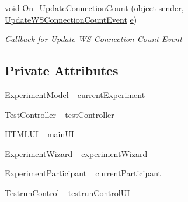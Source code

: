 \begin{DoxyCompactItemize}
\item 
void \hyperlink{class_web_analyzer_1_1_controller_1_1_main_controller_aa5f17af11b8604a5bb8d78d3f7ec5d7a}{On\+\_\+\+Update\+Connection\+Count} (\hyperlink{_u_i_2_h_t_m_l_resources_2js_2lib_2underscore_8min_8js_aae18b7515bb2bc4137586506e7c0c903}{object} sender, \hyperlink{class_web_analyzer_1_1_events_1_1_update_w_s_connection_count_event}{Update\+W\+S\+Connection\+Count\+Event} \hyperlink{_u_i_2_h_t_m_l_resources_2js_2lib_2bootstrap_8min_8js_ab5902775854a8b8440bcd25e0fe1c120}{e})
\begin{DoxyCompactList}\small\item\em Callback for Update W\+S Connection Count Event \end{DoxyCompactList}\end{DoxyCompactItemize}
\subsection*{Private Attributes}
\begin{DoxyCompactItemize}
\item 
\hyperlink{class_web_analyzer_1_1_models_1_1_base_1_1_experiment_model}{Experiment\+Model} \hyperlink{class_web_analyzer_1_1_controller_1_1_main_controller_aa4f1360b63aad914ee646345d48c4837}{\+\_\+current\+Experiment}
\item 
\hyperlink{class_web_analyzer_1_1_controller_1_1_test_controller}{Test\+Controller} \hyperlink{class_web_analyzer_1_1_controller_1_1_main_controller_a89f0064ffc8bd59de5df9e610fc765f1}{\+\_\+test\+Controller}
\item 
\hyperlink{class_web_analyzer_1_1_u_i_1_1_h_t_m_l_u_i}{H\+T\+M\+L\+U\+I} \hyperlink{class_web_analyzer_1_1_controller_1_1_main_controller_a8f4b51e26bd6810c2103a75a9116c7f6}{\+\_\+main\+U\+I}
\item 
\hyperlink{class_web_analyzer_1_1_u_i_1_1_experiment_wizard}{Experiment\+Wizard} \hyperlink{class_web_analyzer_1_1_controller_1_1_main_controller_a00b3a191e545ae8d10db2400f2b498a1}{\+\_\+experiment\+Wizard}
\item 
\hyperlink{class_web_analyzer_1_1_models_1_1_base_1_1_experiment_participant}{Experiment\+Participant} \hyperlink{class_web_analyzer_1_1_controller_1_1_main_controller_ab952ff62d095db81af55f2676923a87a}{\+\_\+current\+Participant}
\item 
\hyperlink{class_web_analyzer_1_1_u_i_1_1_interaction_objects_1_1_testrun_control}{Testrun\+Control} \hyperlink{class_web_analyzer_1_1_controller_1_1_main_controller_a8acee18d61ec9490f689cf2492c56bc0}{\+\_\+testrun\+Control\+U\+I}
\end{DoxyCompactItemize}


